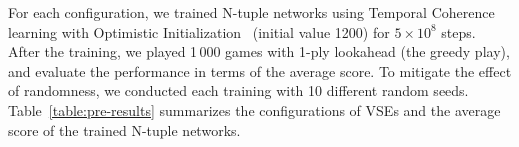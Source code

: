 
For each configuration, we trained N-tuple networks using Temporal Coherence learning with Optimistic Initialization~\cite{GuCW22} (initial value 1200) for $5\times 10^8$ steps.  After the training, we played 1\,000 games with 1-ply lookahead (the greedy play), and evaluate the performance in terms of the average score.  To mitigate the effect of randomness, we conducted each training with 10 different random seeds.
Table~\ref{table:pre-results} summarizes the configurations of VSEs and the average score of the trained N-tuple networks.

